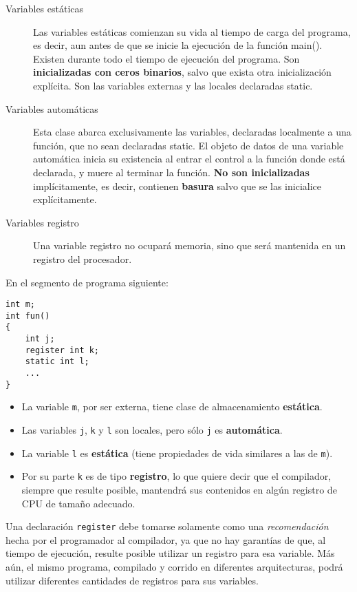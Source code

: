 \begin{description}
	\item[Variables estáticas] Las variables estáticas comienzan su vida al tiempo de carga del programa, es decir, aun antes de que
se inicie la ejecución de la función main(). Existen durante todo el tiempo de ejecución del programa.
Son \textbf{inicializadas con ceros binarios}, salvo que exista otra inicialización explícita. Son las variables
externas y las locales declaradas static.
 \item [Variables automáticas] Esta clase abarca exclusivamente las variables, declaradas localmente a una función, que no sean
declaradas static. El objeto de datos de una variable automática inicia su existencia al entrar el control a la función donde
está declarada, y muere al terminar la función. \textbf{No son inicializadas} implícitamente, es decir, contienen
\textbf{basura} salvo que se las inicialice explícitamente.
\item [Variables registro] Una variable registro no ocupará memoria, sino que será mantenida en un registro del procesador.
\end{description}

\begin{ejemplo}
En el segmento de programa siguiente:
\begin{lstlisting}
int m;
int fun()
{
	int j;
	register int k;
	static int l;
	...
}
\end{lstlisting}
\begin{itemize}
	\item La variable \lstinline{m}, por ser externa, tiene clase de almacenamiento \textbf{estática}. 
	\item Las variables \lstinline{j}, \lstinline{k} y \lstinline{l} son locales, pero sólo \lstinline{j} es \textbf{automática}. 
	\item La variable \lstinline{l} es \textbf{estática} (tiene propiedades de vida similares a las de \lstinline{m}). 
		\item Por su parte \lstinline{k} es de tipo \textbf{registro}, lo que quiere decir que el compilador, siempre que resulte posible, mantendrá sus contenidos en algún registro de CPU de tamaño adecuado. 
\end{itemize}
\end{ejemplo}


Una declaración \lstinline{register} debe tomarse solamente como una \textit{recomendación} hecha por el programador al compilador, ya que no hay garantías de que, al tiempo de ejecución, resulte posible utilizar un registro para esa variable. Más aún, el mismo programa, compilado y corrido en diferentes arquitecturas, podrá utilizar diferentes cantidades de registros para sus variables.

